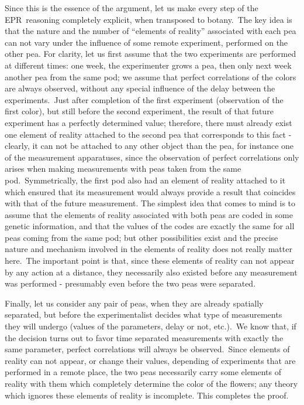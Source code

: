 \documentclass[12pt,onecolumn]{article}%
\begin{document}
Since this is the essence of the argument, let us make every step of the
EPR\ reasoning completely explicit, when transposed to botany.\ The key idea
is that the nature and the number of ``elements of reality'' associated with
each pea can not vary under the influence of some remote experiment, performed
on the other pea. For clarity, let us first assume that the two experiments
are performed at different times: one week, the experimenter grows a pea, then
only next week another pea from the same pod; we assume that perfect
correlations of the colors are always observed, without any special influence
of the delay between the experiments.\ Just after completion of the first
experiment (observation of the first color), but still before the second
experiment, the result of that future experiment has a perfectly determined
value; therefore, there must already exist one element of reality attached to
the second pea that corresponds to this fact - clearly, it can not be attached
to any other object than the pea, for instance one of the measurement
apparatuses, since the observation of perfect correlations only arises when
making measurements with peas taken from the same pod.\ Symmetrically, the
first pod also had an element of reality attached to it which ensured that its
measurement would always provide a result that coincides with that of the
future measurement. The simplest idea that comes to mind is to assume that the
elements of reality associated with both peas are coded in some genetic
information, and that the values of the codes are exactly the same for all
peas coming from the same pod; but other possibilities exist and the precise
nature and mechanism involved in the elements of reality does not really
matter here.\ The important point is that, since these elements of reality can
not appear by any action at a distance, they necessarily also existed before
any measurement was performed - presumably even before the two peas were separated.

Finally, let us consider any pair of peas, when they are already spatially
separated, but before the experimentalist decides what type of measurements
they will undergo (values of the parameters, delay or not, etc.).\ We know
that, if the decision turns out to favor time separated measurements with
exactly the same parameter, perfect correlations will always be
observed.\ Since elements of reality can not appear, or change their values,
depending of experiments that are performed in a remote place, the two peas
necessarily carry some elements of reality with them which completely
determine the color of the flowers; any theory which ignores these elements of
reality is incomplete. This completes the proof.
\end{document}
